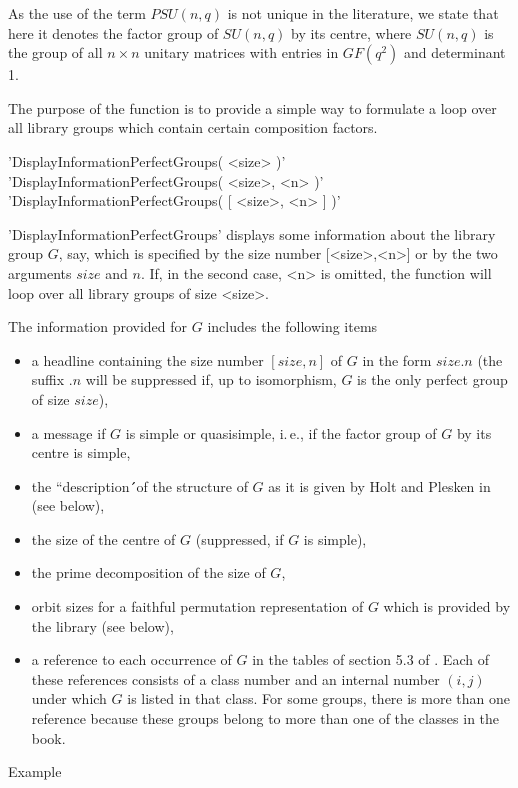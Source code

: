 As the use of the  term $PSU(n,q)$ is  not  unique in the literature,  we
state that here  it denotes the factor  group of $SU(n,q)$ by its centre,
where $SU(n,q)$ is  the group of all $n  \times n$ unitary matrices  with
entries in $GF(q^2)$ and determinant 1.

The purpose  of the function is  to provide a  simple way to  formulate a
loop over all library groups which contain certain composition factors.

\vspace{5mm}
'DisplayInformationPerfectGroups( <size> )'%
 \\
'DisplayInformationPerfectGroups( <size>, <n> )' \\
'DisplayInformationPerfectGroups( [ <size>, <n> ] )'

'DisplayInformationPerfectGroups' displays  some  information about   the
library group   $G$,  say,  which  is  specified    by the   size  number
[<size>,<n>] or by the two  arguments $size$ and $n$.   If, in the second
case, <n> is omitted,  the function will  loop over all library groups of
size <size>.

The information provided for $G$ includes the following items\:
\vspace{-2mm}
\begin{itemize}
\item a headline containing the size number $[size,n]$ of $G$ in the form
      $size.n$ (the suffix $.n$ will be suppressed if, up to isomorphism,
      $G$ is the only perfect group of size $size$), \vspace{-2mm}
\item a message  if $G$ is  simple or quasisimple,  i.\,e., if the factor
      group of $G$ by its centre is simple, \vspace{-2mm}
\item the ``description\'\'\  of the  structure of $G$  as it is given by
      Holt and Plesken in \cite{HP89} (see below), \vspace{-2mm}
\item the size of the centre of  $G$  (suppressed,  if  $G$  is  simple),
      \vspace{-2mm}
\item the prime decomposition of the size of $G$, \vspace{-2mm}
\item orbit sizes for a faithful permutation representation of $G$  which
      is provided by the library (see below), \vspace{-2mm}
\item a reference to each occurrence of $G$  in the tables of section 5.3
      of \cite{HP89}. Each of these references consists of a class number
      and an internal number  $(i,j)$  under which $G$  is listed in that
      class.  For some groups,  there is more than one reference  because
      these groups  belong to more than one  of the classes  in the book.
      \vspace{-2mm}
\end{itemize}
Example\:

